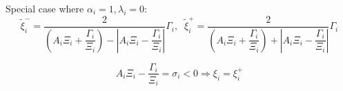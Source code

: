 \documentclass[aps,12pt]{revtex4}
\begin{document}
Special case where $\alpha_i=1, \lambda_i=0$:
\begin{equation}
	\tilde{\xi}_i^- = \dfrac{2}{\left( A_i \Xi_i + \dfrac{\Gamma_i}{\Xi_i} \right) - \left| A_i \Xi_i - \dfrac{\Gamma_i}{\Xi_i} \right| } \Gamma_i
	,\;\;
 	\tilde{\xi}_i^+ = \dfrac{2}{\left( A_i \Xi_i + \dfrac{\Gamma_i}{\Xi_i} \right) + \left| A_i \Xi_i - \dfrac{\Gamma_i}{\Xi_i} \right| } \Gamma_i
\end{equation}

$$
	A_i \Xi_i - \frac{\Gamma_i}{\Xi_i} = \sigma_i  < 0  \Rightarrow \xi_i = \xi_i^+
$$
 
 
\end{document}

